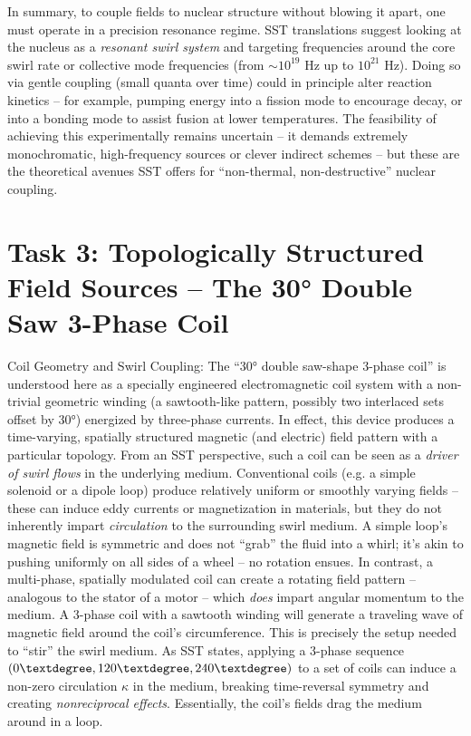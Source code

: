 \documentclass[11pt]{article}
\begin{document}
In summary, to couple fields to nuclear structure without blowing it apart, one must operate in a precision resonance regime. SST translations suggest looking at the nucleus as a \textit{resonant swirl system} and targeting frequencies around the core swirl rate or collective mode frequencies (from $\sim10^{19}$ Hz up to $10^{21}$ Hz). Doing so via gentle coupling (small quanta over time) could in principle alter reaction kinetics – for example, pumping energy into a fission mode to encourage decay, or into a bonding mode to assist fusion at lower temperatures. The feasibility of achieving this experimentally remains uncertain – it demands extremely monochromatic, high-frequency sources or clever indirect schemes – but these are the theoretical avenues SST offers for “non-thermal, non-destructive” nuclear coupling.


\section*{Task 3: Topologically Structured Field Sources – The 30° Double Saw 3-Phase Coil}

Coil Geometry and Swirl Coupling: The “30° double saw-shape 3-phase coil” is understood here as a specially engineered electromagnetic coil system with a non-trivial geometric winding (a sawtooth-like pattern, possibly two interlaced sets offset by 30°) energized by three-phase currents. In effect, this device produces a time-varying, spatially structured magnetic (and electric) field pattern with a particular topology. From an SST perspective, such a coil can be seen as a \textit{driver of swirl flows} in the underlying medium. Conventional coils (e.g. a simple solenoid or a dipole loop) produce relatively uniform or smoothly varying fields – these can induce eddy currents or magnetization in materials, but they do not inherently impart \textit{circulation} to the surrounding swirl medium. A simple loop’s magnetic field is symmetric and does not “grab” the fluid into a whirl; it’s akin to pushing uniformly on all sides of a wheel – no rotation ensues. In contrast, a multi-phase, spatially modulated coil can create a rotating field pattern – analogous to the stator of a motor – which \textit{does} impart angular momentum to the medium. A 3-phase coil with a sawtooth winding will generate a traveling wave of magnetic field around the coil’s circumference. This is precisely the setup needed to “stir” the swirl medium. As SST states, applying a 3-phase sequence $(0\textdegree,120\textdegree,240\textdegree)$ to a set of coils can induce a non-zero circulation $\kappa$ in the medium, breaking time-reversal symmetry and creating \textit{nonreciprocal effects}. Essentially, the coil’s fields drag the medium around in a loop.
\end{document}
